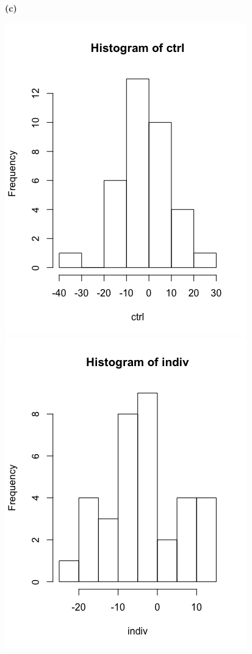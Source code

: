 \documentclass[11pt]{article}
\renewcommand\part[1]{\vspace{.10in}\textbf{(#1)}\par}
\begin{document}
	\part{c}
		\includegraphics[scale=0.38]{images/ctrlHist.png}
		\includegraphics[scale=0.38]{images/indivHist.png}
\end{document}
